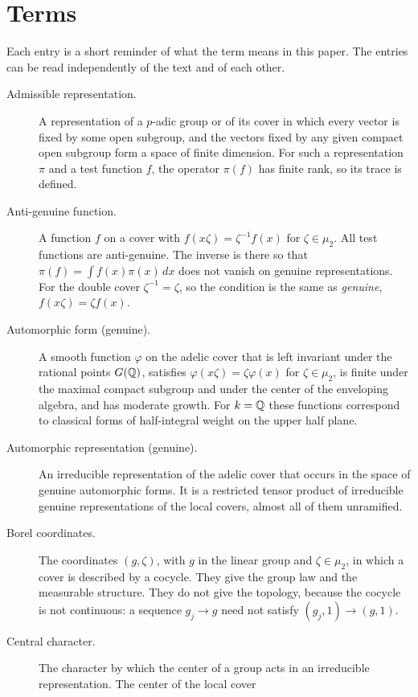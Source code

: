 \section*{Terms}

Each entry is a short reminder of what the term means in this paper. The
entries can be read independently of the text and of each other.

\begin{description}
\item[Admissible representation.] A representation of a $p$-adic group or
  of its cover in which every vector is fixed by some open subgroup, and
  the vectors fixed by any given compact open subgroup form a space of
  finite dimension. For such a representation $\pi$ and a test function
  $f$, the operator $\pi(f)$ has finite rank, so its trace is defined.
\item[Anti-genuine function.] A function $f$ on a cover with
  $f(x\zeta)=\zeta^{-1}f(x)$ for $\zeta\in\mu_2$. All test functions are
  anti-genuine. The inverse is there so that $\pi(f)=\int f(x)\pi(x)\,dx$
  does not vanish on genuine representations. For the double cover
  $\zeta^{-1}=\zeta$, so the condition is the same as \emph{genuine},
  $f(x\zeta)=\zeta f(x)$.
\item[Automorphic form (genuine).] A smooth function $\varphi$ on the
  adelic cover that is left invariant under the rational points $G(\mathbb{Q})$,
  satisfies $\varphi(x\zeta)=\zeta\varphi(x)$ for $\zeta\in\mu_2$, is
  finite under the maximal compact subgroup and under the center of the
  enveloping algebra, and has moderate growth. For $k=\mathbb{Q}$ these functions
  correspond to classical forms of half-integral weight on the upper half
  plane.
\item[Automorphic representation (genuine).] An irreducible representation
  of the adelic cover that occurs in the space of genuine automorphic
  forms. It is a restricted tensor product of irreducible genuine
  representations of the local covers, almost all of them unramified.
\item[Borel coordinates.] The coordinates $(g,\zeta)$, with $g$ in the
  linear group and $\zeta\in\mu_2$, in which a cover is described by a
  cocycle. They give the group law and the measurable structure. They do
  not give the topology, because the cocycle is not continuous: a
  sequence $g_j\to g$ need not satisfy $(g_j,1)\to(g,1)$.
\item[Central character.] The character by which the center of a group
  acts in an irreducible representation. The center of the local cover

\end{description}
